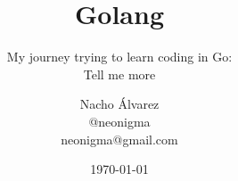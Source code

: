 \documentclass{beamer}
\begin{document}
\title{Golang}
\subtitle{My journey trying to learn coding in Go:\\Tell me more}
\author[Nacho Álvarez]{\texorpdfstring{Nacho Álvarez
  \\ \faTwitter \hspace{5pt}@neonigma
  \\ \faEnvelope \hspace{5pt}neonigma@gmail.com}{Author}}

\date{\today}




\section[Índice]{}
\frame{\tableofcontents}













\end{document}
